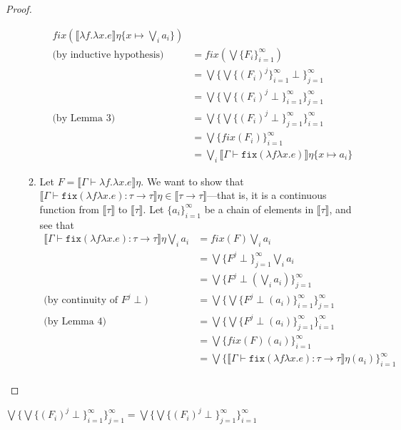\begin{proof}
\begin{itemize}
\begin{enumerate}
\begin{align*}
 fix(\llbracket \lambda f. \lambda x.e \rrbracket\eta\{x\mapsto \bigvee_i a_i\})\\
 \text{(by inductive hypothesis)} &= fix(\bigvee\{F_i\}^{\infty}_{i=1}) \\
 &= \bigvee\{\bigvee\{(F_i)^j \}^{\infty}_{i=1}\perp\}^{\infty}_{j=1} \\
 &= \bigvee\{\bigvee\{(F_i)^j \perp\}^{\infty}_{i=1}\}^{\infty}_{j=1} \\ 
\text{(by Lemma 3)} &= \bigvee\{\bigvee\{(F_i)^j \perp\}^{\infty}_{j=1}\}^{\infty}_{i=1} \\ 
&= \bigvee\{fix(F_i)\}^{\infty}_{i=1}\\
&= \bigvee_i \llbracket \Gamma \vdash \texttt{fix}(\lambda f \lambda x.e)\rrbracket\eta\{x\mapsto a_i\}
 \end{align*}
 \item Let $F = \llbracket \Gamma \vdash \lambda f. \lambda x.e\rrbracket\eta$. We want to show that 
 $\llbracket\Gamma\vdash\texttt{fix}(\lambda f \lambda x.e) : \tau 
 \rightarrow\tau\rrbracket\eta \in \llbracket \tau \rightarrow \tau \rrbracket$---that is, it is a continuous function from 
 $\llbracket \tau \rrbracket$ to $\llbracket \tau \rrbracket$. Let $\{a_i\}^{\infty}_{i=1}$ be a chain of elements in $\llbracket \tau \rrbracket$,
  and see that 
 \begin{align*}
 \llbracket\Gamma\vdash\texttt{fix}(\lambda f \lambda x.e) : \tau \rightarrow\tau\rrbracket\eta \bigvee_i a_i &= 
 fix(F)\bigvee_i a_i\\
 &=\bigvee\{F^j \perp\}^{\infty}_{j=1}\bigvee_i a_i\\
 &= \bigvee\{F^j \perp(\bigvee_i a_i)\}^{\infty}_{j=1}\\ 
 \text{(by continuity of $F^j \perp$) }&= \bigvee\{\bigvee\{F^j \perp(a_i)\}^{\infty}_{i=1}\}^{\infty}_{j=1}\\ 
 \text{(by Lemma 4)} &=\bigvee\{\bigvee\{F^j \perp(a_i)\}^{\infty}_{j=1}\}^{\infty}_{i=1}\\
 &= \bigvee\{fix(F)(a_i)\}^{\infty}_{i=1}\\
 &= \bigvee\{\llbracket\Gamma\vdash\texttt{fix}(\lambda f \lambda x.e) : \tau \rightarrow\tau\rrbracket\eta(a_i)\}^{\infty}_{i=1}\\
 \end{align*}
 \end{enumerate}
 \end{itemize}
 \end{proof}

 \begin{lemma} $\bigvee\{\bigvee\{(F_i)^j \perp\}^{\infty}_{i=1}\}^{\infty}_{j=1}= \bigvee\{\bigvee\{(F_i)^j \perp\}^{\infty}
 _{j=1}\}^{\infty}_{i=1}$\\
 \label{lem:join-interchange-1}
 \end{lemma}


